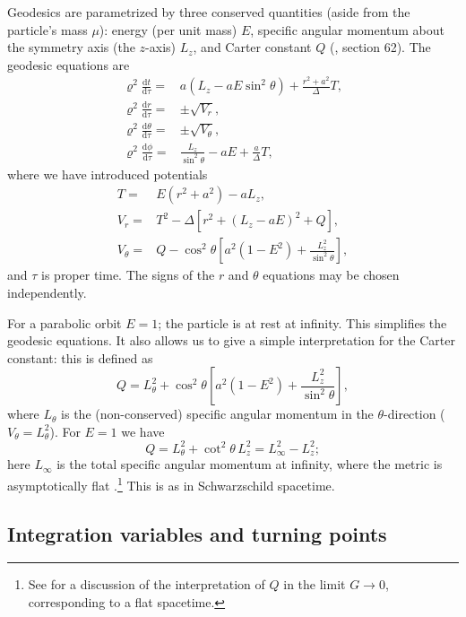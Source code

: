 \documentclass[useAMS,usedcolumn,usegraphicx,usenatbib]{mn2e}
\newcommand{\dd}{\ensuremath{\mathrm{d}}}
\newcommand{\diff}[2]{\ensuremath{\frac{\dd {#1}}{\dd {#2}}}}
\begin{document}
Geodesics are parametrized by three conserved quantities (aside from the particle's mass $\mu$): energy (per unit mass) $E$, specific angular momentum about the symmetry axis (the $z$-axis) $L_z$, and Carter constant $Q$ (\citealt{Carter1968, Chandrasekhar1998}, section 62). The geodesic equations are
\begin{align}
\varrho^2 \diff{t}{\tau} = {} & a\left(L_z - aE\sin^2 \theta\right) + \frac{r^2 + a^2}{\Delta}T,\\
\varrho^2 \diff{r}{\tau} = {} & \pm \sqrt{V_r},\\
\varrho^2 \diff{\theta}{\tau} = {} & \pm \sqrt{V_\theta},\\
\varrho^2 \diff{\phi}{\tau} = {} & \frac{L_z}{\sin^2 \theta} - aE + \frac{a}{\Delta}T,
\end{align}
where we have introduced potentials
\begin{align}
T = {} & E\left(r^2 +a^2\right) - aL_z,\\
V_r = {} & T^2 - \Delta\left[r^2 + \left(L_z -aE\right)^2 + Q\right],\\
V_\theta = {} & Q - \cos^2 \theta\left[a^2\left(1 - E^2\right) + \frac{L_z^2}{\sin^2\theta}\right],
\end{align}
and $\tau$ is proper time. The signs of the $r$ and $\theta$ equations may be chosen independently.

For a parabolic orbit $E = 1$; the particle is at rest at infinity. This simplifies the geodesic equations. It also allows us to give a simple interpretation for the Carter constant: this is defined as
\begin{equation}
Q = L_\theta^2 + \cos^2\theta\left[a^2\left(1 - E^2\right) + \frac{L_z^2}{\sin^2\theta}\right],
\end{equation}
where $L_\theta$ is the (non-conserved) specific angular momentum in the $\theta$-direction ($V_\theta = L_\theta^2$). For $E = 1$ we have
\begin{equation}
Q = L_\theta^2 + \cot^2\theta\, L_z^2 = L_\infty^2 - L_z^2;
\end{equation}
here $L_\infty$ is the total specific angular momentum at infinity, where the metric is asymptotically flat \citep{DeFelice1980}.\footnote{See \citet*{Rosquist2009} for a discussion of the interpretation of $Q$ in the limit $G \rightarrow 0$, corresponding to a flat spacetime.} This is as in Schwarzschild spacetime.

\subsection{Integration variables and turning points}
\end{document}
